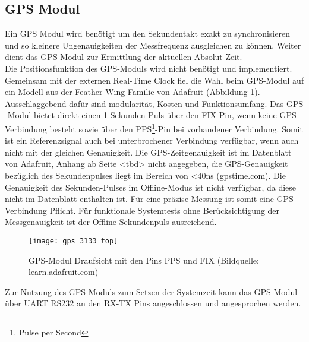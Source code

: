\subsection{GPS Modul}
\label{cap:gps_modul}
	Ein GPS Modul wird benötigt um den Sekundentakt exakt zu synchronisieren und so kleinere Ungenauigkeiten der Messfrequenz ausgleichen zu können. Weiter dient das GPS-Modul zur Ermittlung der aktuellen Absolut-Zeit.\\
	Die Positionsfunktion des GPS-Moduls wird nicht benötigt und implementiert. Gemeinsam mit der externen Real-Time Clock fiel die Wahl beim GPS-Modul auf ein Modell aus der Feather-Wing Familie von Adafruit (Abbildung \ref{fig:GPS3133}).
	Ausschlaggebend dafür sind modularität, Kosten und Funktionsumfang. Das GPS -Modul bietet direkt einen 1-Sekunden-Puls über den FIX-Pin, wenn keine GPS-Verbindung besteht sowie über den PPS\footnote{Pulse per Second}-Pin bei vorhandener Verbindung. Somit ist ein Referenzsignal auch bei unterbrochener Verbindung verfügbar, wenn auch nicht mit der gleichen Genauigkeit.
	Die GPS-Zeitgenauigkeit ist im Datenblatt von Adafruit, Anhang ab Seite <tbd> nicht angegeben, die GPS-Genauigkeit bezüglich des Sekundenpulses liegt im Bereich von <40ns (gpstime.com). %
	Die Genauigkeit des Sekunden-Pulses im Offline-Modus ist nicht verfügbar, da diese nicht im Datenblatt enthalten ist. Für eine präzise Messung ist somit eine GPS-Verbindung Pflicht. Für funktionale Systemtests ohne Berücksichtigung der Messgenauigkeit ist der Offline-Sekundenpuls ausreichend.
		\begin{figure}[H]
        	\centering
        	\texttt{[image: gps\_3133\_top]}
        	\caption{GPS-Modul Draufsicht mit den Pins PPS und FIX (Bildquelle: learn.adafruit.com)}
        	\label{fig:GPS3133}
    	\end{figure}
	\noindent Zur Nutzung des GPS Moduls zum Setzen der Systemzeit kann das GPS-Modul über UART RS232 an den RX-TX Pins angeschlossen und angesprochen werden.
%
%	
